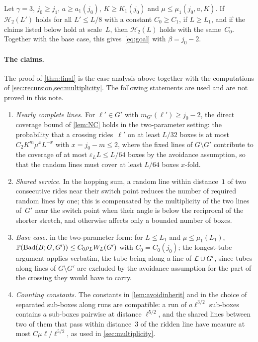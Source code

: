 \documentclass[11pt,letterpaper]{article}
\newcommand{\Bad}{\mathrm{Bad}}
\begin{document}
\begin{theorem}
\label{thm:final}
Let $\gamma=3$, $j_0\ge j_1$, $a\ge a_1(j_0)$, $K\ge K_1(j_0)$ and $\mu\le\mu_1(j_0,a,K)$. If $\mathcal H_2(L')$ holds for all $L'\le L/8$ with a constant $C_0\ge C_1$, if $L\ge L_1$, and if the claims listed below hold at scale~$L$, then $\mathcal H_2(L)$ holds with the same~$C_0$. Together with the base case, this gives~\eqref{eq:goal} with $\beta=j_0-2$.
\end{theorem}

\paragraph{The claims.} The proof of \cref{thm:final} is the case analysis above together with the computations of \cref{sec:recursion,sec:multiplicity}. The following statements are used and are not proved in this note.
\begin{enumerate}
  \item[(C1)] \emph{Nearly complete lines.} For $\ell'\in G'$ with $m_{G'}(\ell')\ge j_0-2$, the direct coverage bound of \cref{lem:NC} holds in the two-parameter setting: the probability that a crossing rides~$\ell'$ on at least $L/32$ boxes is at most $C_2K^{m}\mu^{x}L^{-x}$ with $x=j_0-m\le2$, where the fixed lines of $G\setminus G'$ contribute to the coverage of at most $\varepsilon_LL\le L/64$ boxes by the avoidance assumption, so that the random lines must cover at least $L/64$ boxes $x$-fold.
  \item[(C2)] \emph{Shared service.} In the hopping sum, a random line within distance~$1$ of two consecutive rides near their switch point reduces the number of required random lines by one; this is compensated by the multiplicity of the two lines of~$G'$ near the switch point when their angle is below the reciprocal of the shorter stretch, and otherwise affects only a bounded number of boxes.
  \item[(C3)] \emph{Base case.}  in the two-parameter form: for $L\le L_1$ and $\mu\le\mu_1(L_1)$, $\P(\Bad(B;G,G'))\le C_0\rho_LW_L(G')$ with $C_0=C_0(j_0)$; the longest-tube argument applies verbatim, the tube being along a line of $\mathcal L\cup G'$, since tubes along lines of $G\setminus G'$ are excluded by the avoidance assumption for the part of the crossing they would have to carry.
  \item[(C4)] \emph{Counting constants.} The constants in \cref{lem:avoidinherit} and in the choice of separated sub-boxes along runs are compatible: a run of $a\ell^{3/2}$ sub-boxes contains $a$ sub-boxes pairwise at distance $\ell^{5/2}$, and the shared lines between two of them that pass within distance~$3$ of the ridden line have measure at most $C\mu\ell/\ell^{5/2}$, as used in \cref{sec:multiplicity}.
\end{enumerate}
\end{document}
